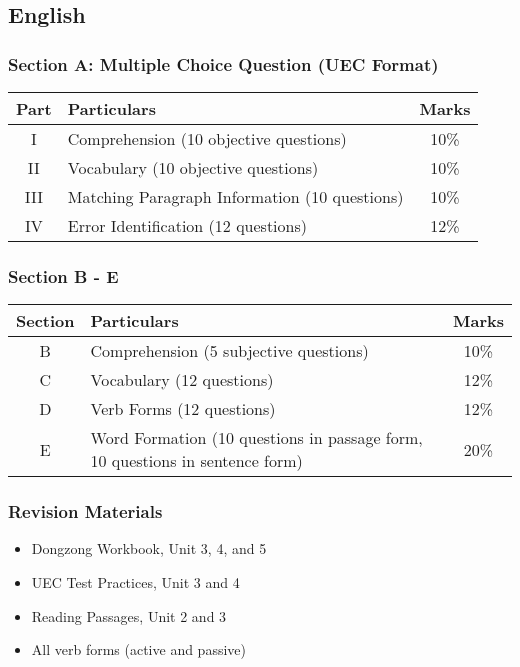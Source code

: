 \documentclass[
]{article}
\begin{document}
\subsection{English}\label{english}

\subsubsection{Section A: Multiple Choice Question (UEC
Format)}\label{section-a-multiple-choice-question-uec-format}

\begin{tabularx}{\textwidth}{cXc}
\toprule
Part & Particulars & Marks \\
\bottomrule
I & Comprehension (10 objective questions) & 10\% \\
\midrule
II & Vocabulary (10 objective questions) & 10\% \\
\midrule
III & Matching Paragraph Information (10 questions) & 10\% \\
\midrule
IV & Error Identification (12 questions) & 12\% \\
\midrule
\end{tabularx}

\subsubsection{Section B - E}\label{section-b---e}

\begin{tabularx}{\textwidth}{cXc}
\toprule
Section & Particulars & Marks \\
\bottomrule
B & Comprehension (5 subjective questions) & 10\% \\
\midrule
C & Vocabulary (12 questions) & 12\% \\
\midrule
D & Verb Forms (12 questions) & 12\% \\
\midrule
E & Word Formation (10 questions in passage form, 10 questions in
sentence form) & 20\% \\
\bottomrule
\end{tabularx}

\subsubsection{Revision Materials}\label{ux590dux4e60ux8d44ux6599}

\begin{itemize}
\item
  Dongzong Workbook, Unit 3, 4, and 5
\item
  UEC Test Practices, Unit 3 and 4
\item
  Reading Passages, Unit 2 and 3
\item
  All verb forms (active and passive)
\end{itemize}
\end{document}
